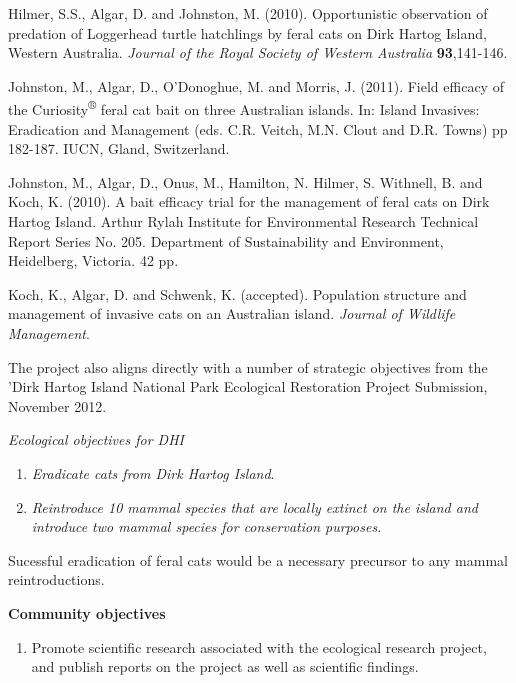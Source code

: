 \documentclass[version=last,
    paper=a4,                               %
    10pt,                                   %
    dvipsnames,
    oneside,                              %
    headings=openany,                       %
    open=any,
    BCOR=7mm,                               %
    DIV=15,     %
]{scrbook}
\begin{document}
Hilmer, S.S., Algar, D. and Johnston, M. (2010). Opportunistic
observation of predation of Loggerhead turtle hatchlings by feral cats
on Dirk Hartog Island, Western Australia. \emph{Journal of the Royal
Society of Western Australia} \textbf{93},141-146.

Johnston, M., Algar, D., O'Donoghue, M. and Morris, J. (2011). Field
efficacy of the Curiosity\textsuperscript{®} feral cat bait on three
Australian islands. In: Island Invasives: Eradication and Management
(eds. C.R. Veitch, M.N. Clout and D.R. Towns) pp 182-187. IUCN, Gland,
Switzerland.

Johnston, M., Algar, D., Onus, M., Hamilton, N. Hilmer, S. Withnell, B.
and Koch, K. (2010). A bait efficacy trial for the management of feral
cats on Dirk Hartog Island. Arthur Rylah Institute for Environmental
Research Technical Report Series No. 205. Department of Sustainability
and Environment, Heidelberg, Victoria. 42 pp.

Koch, K., Algar, D. and Schwenk, K. (accepted). Population structure and
management of invasive cats on an Australian island. \emph{Journal of
Wildlife Management}.

The project also aligns directly with a number of strategic objectives
from the 'Dirk Hartog Island National Park Ecological Restoration
Project Submission, November 2012.

\emph{Ecological objectives for DHI}

\begin{enumerate}
\itemsep1pt\parskip0pt
\item
  \emph{Eradicate cats from Dirk Hartog Island}.
\item
  \emph{Reintroduce 10 mammal species that are locally extinct on the
  island and introduce two mammal species for conservation purposes.}
\end{enumerate}

Sucessful eradication of feral cats would be a necessary precursor to
any mammal reintroductions.

\textbf{Community objectives}

\begin{enumerate}
\itemsep1pt\parskip0pt
\item
  Promote scientific research associated with the ecological research
  project, and publish reports on the project as well as scientific
  findings.
\end{enumerate}
\end{document}
